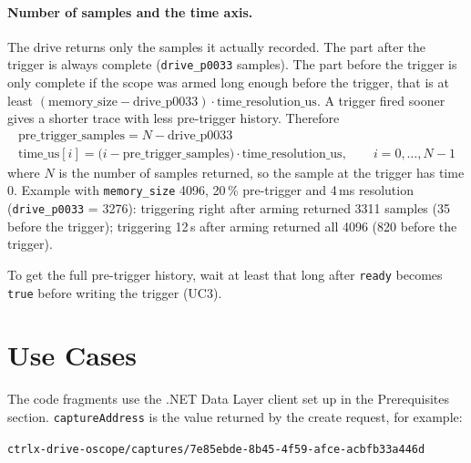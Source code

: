 \documentclass[11pt,a4paper]{article}
\newcommand{\dl}[1]{\texttt{#1}}
\begin{document}
\paragraph{Number of samples and the time axis.}
The drive returns only the samples it actually recorded. The part after the
trigger is always complete (\dl{drive\_p0033} samples). The part before the
trigger is only complete if the scope was armed long enough before the trigger,
that is at least
$(\text{memory\_size} - \text{drive\_p0033}) \cdot \text{time\_resolution\_us}$.
A trigger fired sooner gives a shorter trace with less pre-trigger history.
Therefore
\begin{gather*}
  \text{pre\_trigger\_samples} = N - \text{drive\_p0033}\\
  \text{time\_us}[i] = \bigl(i - \text{pre\_trigger\_samples}\bigr)\cdot \text{time\_resolution\_us},
  \qquad i = 0,\dots,N-1
\end{gather*}
where $N$ is the number of samples returned, so the sample at the trigger has
time 0. Example with \dl{memory\_size} 4096, 20\,\% pre-trigger and 4\,ms
resolution (\dl{drive\_p0033} = 3276): triggering right after arming returned
3311 samples (35 before the trigger); triggering 12\,s after arming returned
all 4096 (820 before the trigger).

To get the full pre-trigger history, wait at least that long after \dl{ready}
becomes \dl{true} before writing the trigger (UC3).

\section{Use Cases}

The code fragments use the .NET Data Layer client set up in the
Prerequisites section. \dl{captureAddress} is the value returned by the create
request, for example:

\begin{center}
\small\dl{ctrlx-drive-oscope/captures/7e85ebde-8b45-4f59-afce-acbfb33a446d}
\end{center}
\end{document}
